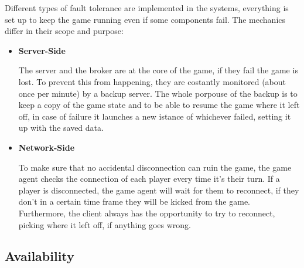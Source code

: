 \documentclass{scrartcl}
\begin{document}
Different types of fault tolerance are implemented in the systems, everything is set up to keep
the game running even if some components fail. \newline
The mechanics differ in their scope and purpose:
\begin{itemize}
  \item
  \textbf{Server-Side} \par
  The server and the broker are at the core of the game, if they fail the game is lost. \newline
  To prevent this from happening, they are costantly monitored (about once per minute) by a backup
  server. The whole porpouse of the backup is to keep a copy of the game state and to be able to
  resume the game where it left off, in case of failure it launches a new istance of 
  whichever failed, setting it up with the saved data.
  \item
  \textbf{Network-Side} \par
  To make sure that no accidental disconnection can ruin the game, the game agent checks the connection
  of each player every time it's their turn. If a player is disconnected, the game agent will wait for
  them to reconnect, if they don't in a certain time frame they will be kicked from the game. \newline
  Furthermore, the client always has the opportunity to try to reconnect, picking where it left
  off, if anything goes wrong.
\end{itemize}

\subsection{Availability}\label{availability}


\end{document}
